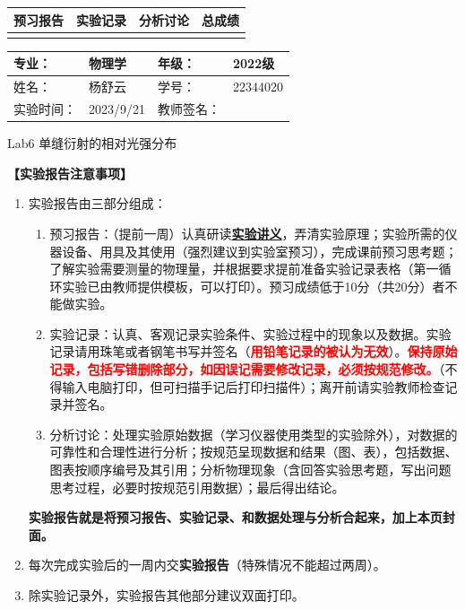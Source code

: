 \documentclass[dvipsnames, svgnames,a4paper,11pt]{article}
\begin{document}
	
	
	
	\begin{table}
		\renewcommand\arraystretch{1.7}
		\begin{tabularx}{\textwidth}{
				|X|X|X|X
				|X|X|X|X|}
			\hline
			\multicolumn{2}{|c|}{预习报告}&\multicolumn{2}{|c|}{实验记录}&\multicolumn{2}{|c|}{分析讨论}&\multicolumn{2}{|c|}{总成绩}\\
			\hline
			& & & & & & & \\
			\hline
		\end{tabularx}
	\end{table}
	
	\begin{table}
		\renewcommand\arraystretch{1.7}
		\begin{tabularx}{\textwidth}{|X|X|X|X|}
			\hline
			专业： & 物理学 &年级： & 2022级\\
			\hline
			姓名： & 杨舒云  & 学号： & 22344020\\
			\hline
			实验时间： & 2023/9/21 & 教师签名： & \\
			\hline
		\end{tabularx}
	\end{table}
	
	\begin{center}
		\LARGE Lab6 \quad 单缝衍射的相对光强分布
	\end{center}
	
	\textbf{【实验报告注意事项】}
	\begin{enumerate}
		\item 实验报告由三部分组成：
		\begin{enumerate}
			\item 预习报告：（提前一周）认真研读\underline{\textbf{实验讲义}}，弄清实验原理；实验所需的仪器设备、用具及其使用（强烈建议到实验室预习），完成课前预习思考题；了解实验需要测量的物理量，并根据要求提前准备实验记录表格（第一循环实验已由教师提供模板，可以打印）。预习成绩低于10分（共20分）者不能做实验。
			\item 实验记录：认真、客观记录实验条件、实验过程中的现象以及数据。实验记录请用珠笔或者钢笔书写并签名（\textcolor{red}{\textbf{用铅笔记录的被认为无效}}）。\textcolor{red}{\textbf{保持原始记录，包括写错删除部分，如因误记需要修改记录，必须按规范修改。}}（不得输入电脑打印，但可扫描手记后打印扫描件）；离开前请实验教师检查记录并签名。
			\item 分析讨论：处理实验原始数据（学习仪器使用类型的实验除外），对数据的可靠性和合理性进行分析；按规范呈现数据和结果（图、表），包括数据、图表按顺序编号及其引用；分析物理现象（含回答实验思考题，写出问题思考过程，必要时按规范引用数据）；最后得出结论。
		\end{enumerate}
		\textbf{实验报告就是将预习报告、实验记录、和数据处理与分析合起来，加上本页封面。}
		\item 每次完成实验后的一周内交\textbf{实验报告}（特殊情况不能超过两周）。
		\item 除实验记录外，实验报告其他部分建议双面打印。
	\end{enumerate}
	
\end{document}
